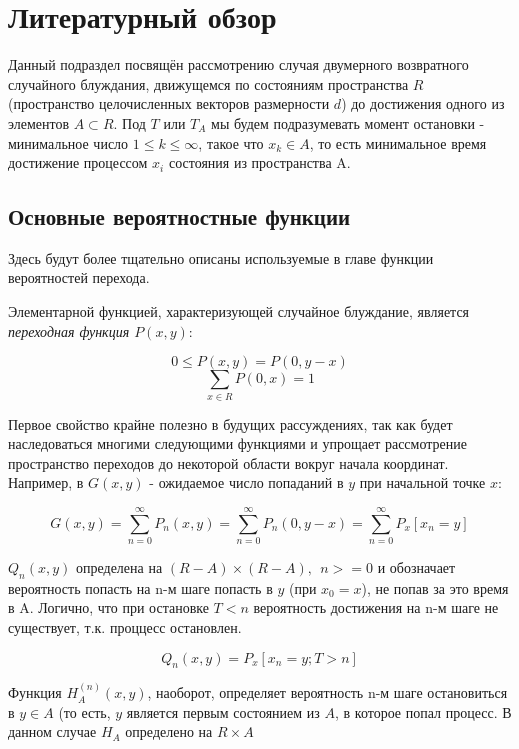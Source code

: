 \section{Литературный обзор}

Данный подраздел посвящён рассмотрению случая двумерного возвратного случайного блуждания, движущемся по состояниям пространства $R$ (пространство целочисленных векторов размерности $d$) до достижения одного из элементов $A \subset R$. Под $T$ или $T_A$ мы будем подразумевать момент остановки - минимальное число $1 \leq k \leq \infty$, такое что $x_k \in A$, то есть минимальное время достижение процессом ${x_i}$ состояния из пространства A.

\subsection{Основные вероятностные функции}

Здесь будут более тщательно описаны используемые в главе функции вероятностей перехода.

Элементарной функцией, характеризующей случайное блуждание, является \textit{переходная функция $P(x,y)$}:

\[ 0 \leq P(x,y) = P(0, y-x) \]
\[ \sum_{x \in R} P(0,x) = 1 \]

Первое свойство крайне полезно в будущих рассуждениях, так как будет наследоваться многими следующими функциями и упрощает рассмотрение пространство
переходов до некоторой области вокруг начала координат. Например, в $G(x,y)$ - ожидаемое число попаданий в $y$ при начальной точке $x$:

\begin{equation}
G(x,y) = \sum_{n=0}^{\infty} P_n(x,y) = \sum_{n=0}^{\infty} P_n(0, y - x) = \sum_{n=0}^{\infty} P_x[x_n=y]
\end{equation}

$Q_n(x,y)$ определена на $(R-A) \times (R-A),\ \ n >= 0$ и обозначает вероятность попасть на n-м шаге попасть в $y$ (при $x_0 = x$), не попав за это время в A. Логично, что при остановке $T<n$ вероятность достижения на n-м шаге не существует, т.к. проццесс остановлен.

\begin{equation}
 Q_n(x,y) = P_x[x_n=y; T>n]
\end{equation}

Функция $H^{(n)}_A(x,y)$, наоборот, определяет вероятность n-м шаге остановиться в $y \in A$ (то есть, $y$ является первым состоянием из $A$, в которое попал процесс. В данном случае $H_A$ определено на $R \times A$

